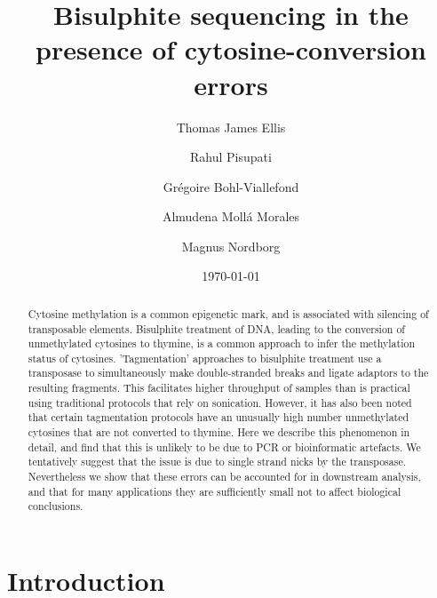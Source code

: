 \documentclass[12pt,longbibliography]{article}
\title{Bisulphite sequencing in the presence of cytosine-conversion errors} %
\author{
    Thomas James Ellis 
    \and
    Rahul Pisupati 
    \and
    Gr\'{e}goire Bohl-Viallefond
    \and
    Almudena Moll\'a Morales
    \and
    Magnus Nordborg
}
\date{\today} %
\begin{document}
\maketitle

\begin{abstract}
    Cytosine methylation is a common epigenetic mark, and is associated with silencing of transposable elements.
    Bisulphite treatment of DNA, leading to the conversion of unmethylated cytosines to thymine, is a common approach to infer the methylation status of cytosines.
    'Tagmentation' approaches to bisulphite treatment use a transposase to simultaneously make double-stranded breaks and ligate adaptors to the resulting fragments.
    This facilitates higher throughput of samples than is practical using traditional protocols that rely on sonication.
    However, it has also been noted that certain tagmentation protocols have an unusually high number unmethylated cytosines that are not converted to thymine.
    Here we describe this phenomenon in detail, and find that this is unlikely to be due to PCR or bioinformatic artefacts.
    We tentatively suggest that the issue is due to single strand nicks by the transposase.
    Nevertheless we show that these errors can be accounted for in downstream analysis, and that for many applications they are sufficiently small not to affect biological conclusions.
    \end{abstract}






\maketitle


\section{Introduction}
\end{document}
